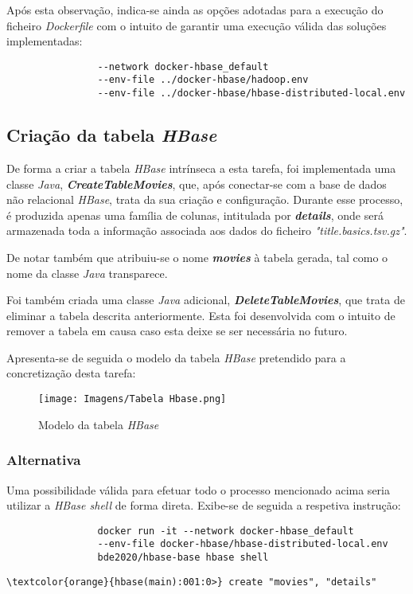 \documentclass[a4paper]{report}
\begin{document}
{        Após esta observação, indica-se ainda as opções adotadas para a execução do ficheiro \textit{Dockerfile} com o intuito de garantir uma execução válida das soluções implementadas:
        {
            \color{teal}
            \begin{verbatim}
			    --network docker-hbase_default
			    --env-file ../docker-hbase/hadoop.env
			    --env-file ../docker-hbase/hbase-distributed-local.env
            \end{verbatim}
        }
		
		\subsection{Criação da tabela \textit{HBase}} \label{job1-1}
		De forma a criar a tabela \textit{HBase} intrínseca a esta tarefa, foi implementada uma classe \textit{Java}, \textbf{\textit{CreateTableMovies}}, que, após conectar-se com a base de dados não relacional \textit{HBase}, trata da sua criação e configuração.
		Durante esse processo, é produzida apenas uma família de colunas, intitulada por \textbf{\textit{details}}, onde será armazenada toda a informação associada aos dados do ficheiro \textit{"title.basics.tsv.gz"}.

		De notar também que atribuiu-se o nome \textbf{\textit{movies}} à tabela gerada, tal como o nome da classe \textit{Java} transparece.

		Foi também criada uma classe \textit{Java} adicional, \textbf{\textit{DeleteTableMovies}}, que trata de eliminar a tabela descrita anteriormente. Esta foi desenvolvida com o intuito de remover a tabela em causa caso esta deixe se ser necessária no futuro.
        
        Apresenta-se de seguida o modelo da tabela \textit{HBase} pretendido para a concretização desta tarefa:
        \begin{figure}[h]
            \centering
            \texttt{[image: Imagens/Tabela Hbase.png]}
            \caption{Modelo da tabela \textit{HBase}}
            \label{figure1}
        \end{figure}

		\subsubsection{Alternativa}
		Uma possibilidade válida para efetuar todo o processo mencionado acima seria utilizar a \textit{HBase shell} de forma direta. Exibe-se de seguida a respetiva instrução:
        {
            \color{teal}
            \begin{verbatim}
			    docker run -it --network docker-hbase_default
			    --env-file docker-hbase/hbase-distributed-local.env
			    bde2020/hbase-base hbase shell
            \end{verbatim}
        }
        {
			\color{teal}
			\begin{Verbatim}[commandchars=\\\{\}]
	    \textcolor{orange}{hbase(main):001:0>} create "movies", "details"
			\end{Verbatim}
		}

}
\end{document}
